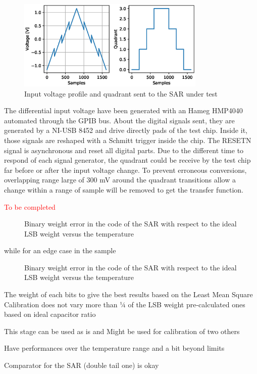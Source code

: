 \begin{figure}[htp]
    \centering
    \includegraphics[width=0.8\textwidth]{Chapter5/Figs/sar_test/sar-test-input.eps}
    \caption{Input voltage profile and quadrant sent to the SAR under test}
    \label{fig:sar-test-input}
\end{figure}

The differential input voltage have been generated with an Hameg HMP4040 automated through the GPIB bus. About the digital signals sent, they are generated by a NI-USB 8452 and drive directly pads of the test chip. Inside it, those signals are reshaped with a Schmitt trigger inside the chip. The RESETN signal is asynchronous and reset all digital parts. Due to the different time to respond of each signal generator, the quadrant could be receive by the test chip far before or after the input voltage change. To prevent erroneous conversions, overlapping range large of 300 mV around the quadrant transitions allow a change within a range of sample will be removed to get the transfer function. 

\textcolor{red}{To be completed}

\begin{figure}[htp]
    \centering
    
    \caption{Binary weight error in the code of the SAR with respect to the ideal LSB weight versus the temperature}
    \label{fig:sar-test-coef_doe05_11}
\end{figure}

while for an edge case in the sample

\begin{figure}[htp]
    \centering
    
    \caption{Binary weight error in the code of the SAR with respect to the ideal LSB weight versus the temperature}
    \label{fig:sar-test-coef_doe05_11}
\end{figure}

The weight of each bits to give the best results based on the Least Mean Square Calibration does not vary more than ¼ of the LSB weight pre-calculated ones based on ideal capacitor ratio

This stage can be used as is and Might be used for calibration of two others

Have performances over the temperature range and a bit beyond limits

Comparator for the SAR (double tail one) is okay

